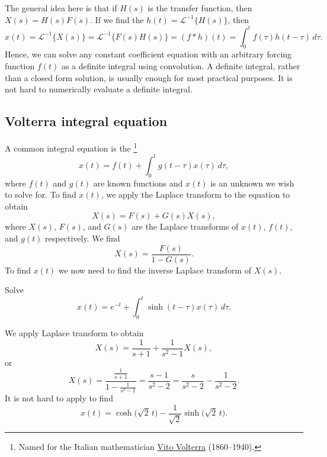 The general idea here is that if $H(s)$ is the transfer function, then
$X(s)=H(s)F(s)$.
If we find the $h(t) = {\mathcal{L}}^{-1}\bigl\{ H(s) \bigr\}$, then
\begin{equation*}
x(t)
= {\mathcal{L}}^{-1}\bigl\{ X(s) \bigr\}
= {\mathcal{L}}^{-1}\bigl\{ F(s)H(s) \bigr\}
= (f * h)(t)
= \int_0^t f(\tau) h(t-\tau) \, d\tau .
\end{equation*}
Hence,
we can solve any constant coefficient equation with an arbitrary forcing
function $f(t)$ as a definite integral using convolution.
A definite integral, rather than a closed form solution, is usually enough
for most practical purposes.  It is
not hard to numerically evaluate a definite integral.

\subsection{Volterra integral equation}

A common integral equation
is the \emph{}%
\footnote{Named for the Italian mathematician
\href{https://en.wikipedia.org/wiki/Vito_Volterra}{Vito Volterra}
(1860--1940).}
\begin{equation*}
x(t) = f(t) + \int_0^t g(t-\tau) x(\tau) \, d\tau ,
\end{equation*}
where $f(t)$ and $g(t)$ are known functions and $x(t)$ is an unknown we
wish to solve for.
To find $x(t)$,
we apply the Laplace transform to the equation to obtain 
\begin{equation*}
X(s) = F(s) + G(s) X(s) ,
\end{equation*}
where $X(s)$, $F(s)$, and $G(s)$ are the Laplace transforms of $x(t)$, $f(t)$, and
$g(t)$ respectively.  We find
\begin{equation*}
X(s) = \frac{F(s)}{1-G(s)} .
\end{equation*}
To find $x(t)$ we now need to find the 
inverse Laplace transform of $X(s)$.

\begin{example}
Solve
\begin{equation*}
x(t) =  e^{-t} + \int_0^t \sinh(t-\tau) x(\tau) \, d\tau .
\end{equation*}

We apply Laplace transform to obtain
\begin{equation*}
X(s) = \frac{1}{s+1} + \frac{1}{s^2-1} X(s) ,
\end{equation*}
or
\begin{equation*}
X(s) = \frac{\frac{1}{s+1}}{1- \frac{1}{s^2-1}}
=
\frac{s-1}{s^2 - 2}
=
\frac{s}{s^2 - 2}
-
\frac{1}{s^2 - 2} .
\end{equation*}
It is not hard to apply  to find
\begin{equation*}
x(t) = \cosh \bigl( \sqrt{2} \, t \bigr) -
\frac{1}{\sqrt{2}} \sinh \bigl( \sqrt{2}\, t \bigr).
\end{equation*}
\end{example}

